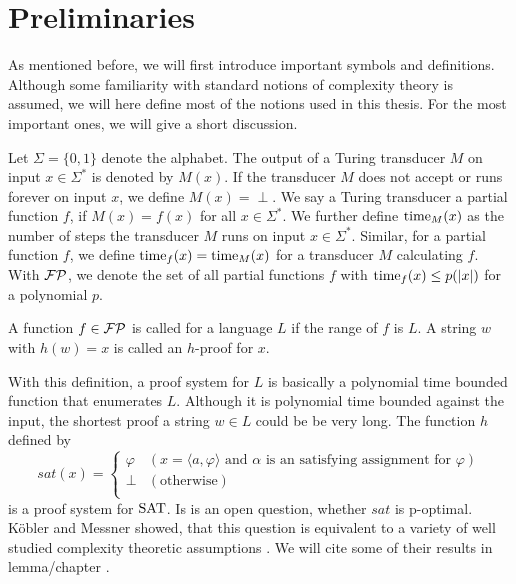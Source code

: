 \chapter{Preliminaries}
  As mentioned before, we will first introduce important symbols and definitions. Although some familiarity with standard notions of complexity theory is assumed, we will here define most of the notions used in this thesis. For the most important ones, we will give a short discussion.

  Let \(\Sigma = \{ 0, 1 \}\) denote the alphabet. The output of a Turing transducer \(M\) on input \(x \in \Sigma^*\) is denoted by \(M(x)\). If the transducer \(M\) does not accept or runs forever on input \(x\), we define \(M(x) = \perp\). We say a Turing transducer  a partial function \(f\), if \(M(x) = f(x)\) for all \(x \in \Sigma^*\). We further define \(\operatorname{time}_M(x)\) as the number of steps the transducer \(M\) runs on input \(x \in \Sigma^*\). Similar, for a partial function \(f\), we define \(\operatorname{time}_f(x) = \operatorname{time}_M(x)\) for a transducer \(M\) calculating \(f\).  With \(\mathcal{FP}\), we denote the set of all partial functions \(f\) with \(\operatorname{time}_f(x) \leq p(|x|)\) for a polynomial \(p\).

  \begin{definition}
    A function \(f \in \mathcal{FP}\) is called  for a language \(L\) if the range of \(f\) is \(L\). A string \(w\) with \(h(w) = x\) is called an \(h\)-proof for \(x\).
  \end{definition}

  With this definition, a proof system for \(L\) is basically a polynomial time bounded function that enumerates \(L\). Although it is polynomial time bounded against the input, the shortest proof a string \(w \in L\) could be be very long. The function \(h\) defined by
    \[
       sat(x) =
       \begin{cases}
         \varphi & (x = \langle a, \varphi \rangle \text{ and \(\alpha\) is an satisfying assignment for \(\varphi\)}) \\
         \perp & (\text{otherwise}) \\
       \end{cases}
    \]
  is a proof system for \(\text{SAT}\). Is is an open question, whether \(sat\) is p-optimal. Köbler and Messner showed, that this question is equivalent to a variety of well studied complexity theoretic assumptions \cite{KM00}. We will cite some of their results in lemma/chapter .

